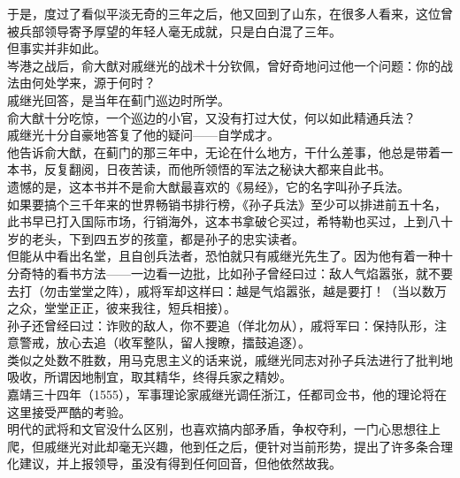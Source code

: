 \begin{multicols}{\theparacolNo}
于是，度过了看似平淡无奇的三年之后，他又回到了山东，在很多人看来，这位曾被兵部领导寄予厚望的年轻人毫无成就，只是白白混了三年。\\

但事实并非如此。\\

岑港之战后，俞大猷对戚继光的战术十分钦佩，曾好奇地问过他一个问题：你的战法由何处学来，源于何时？\\

戚继光回答，是当年在蓟门巡边时所学。\\

俞大猷十分吃惊，一个巡边的小官，又没有打过大仗，何以如此精通兵法？\\

戚继光十分自豪地答复了他的疑问——自学成才。\\

他告诉俞大猷，在蓟门的那三年中，无论在什么地方，干什么差事，他总是带着一本书，反复翻阅，日夜苦读，而他所领悟的军法之秘诀大都来自此书。\\

遗憾的是，这本书并不是俞大猷最喜欢的《易经》，它的名字叫孙子兵法。\\

如果要搞个三千年来的世界畅销书排行榜，《孙子兵法》至少可以排进前五十名，此书早已打入国际市场，行销海外，这本书拿破仑买过，希特勒也买过，上到八十岁的老头，下到四五岁的孩童，都是孙子的忠实读者。\\

但能从中看出名堂，且自创兵法者，恐怕就只有戚继光先生了。因为他有着一种十分奇特的看书方法——一边看一边批，比如孙子曾经曰过：敌人气焰嚣张，就不要去打（勿击堂堂之阵），戚将军却这样曰：越是气焰嚣张，越是要打！（当以数万之众，堂堂正正，彼来我往，短兵相接）。\\

孙子还曾经曰过：诈败的敌人，你不要追（佯北勿从），戚将军曰：保持队形，注意警戒，放心去追（收军整队，留人搜瞭，擂鼓追逐）。\\

类似之处数不胜数，用马克思主义的话来说，戚继光同志对孙子兵法进行了批判地吸收，所谓因地制宜，取其精华，终得兵家之精妙。\\

嘉靖三十四年（1555），军事理论家戚继光调任浙江，任都司佥书，他的理论将在这里接受严酷的考验。\\

明代的武将和文官没什么区别，也喜欢搞内部矛盾，争权夺利，一门心思想往上爬，但戚继光对此却毫无兴趣，他到任之后，便针对当前形势，提出了许多条合理化建议，并上报领导，虽没有得到任何回音，但他依然故我。\\


\end{multicols}

